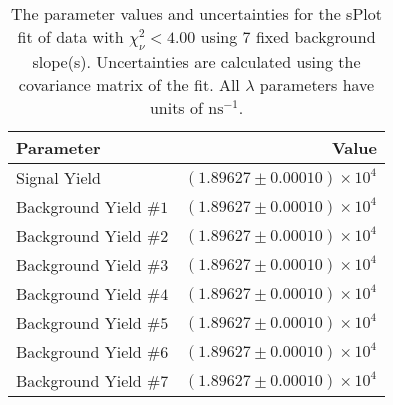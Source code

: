 
\begin{table}
    \begin{center}
        \begin{tabular}{lr}\toprule
            Parameter & Value \\\midrule
            Signal Yield & $(1.89627 \pm 0.00010) \times 10^{4}$ \\
            Background Yield $\#1$ & $(1.89627 \pm 0.00010) \times 10^{4}$ \\
            Background Yield $\#2$ & $(1.89627 \pm 0.00010) \times 10^{4}$ \\
            Background Yield $\#3$ & $(1.89627 \pm 0.00010) \times 10^{4}$ \\
            Background Yield $\#4$ & $(1.89627 \pm 0.00010) \times 10^{4}$ \\
            Background Yield $\#5$ & $(1.89627 \pm 0.00010) \times 10^{4}$ \\
            Background Yield $\#6$ & $(1.89627 \pm 0.00010) \times 10^{4}$ \\
            Background Yield $\#7$ & $(1.89627 \pm 0.00010) \times 10^{4}$ \\\bottomrule
        \end{tabular}
        \caption{The parameter values and uncertainties for the sPlot fit of data with $\chi^2_\nu < 4.00$ using 7 fixed background slope(s). Uncertainties are calculated using the covariance matrix of the fit. All $\lambda$ parameters have units of $\si{\nano\second}^{-1}$.}
    \end{center}
\end{table}
